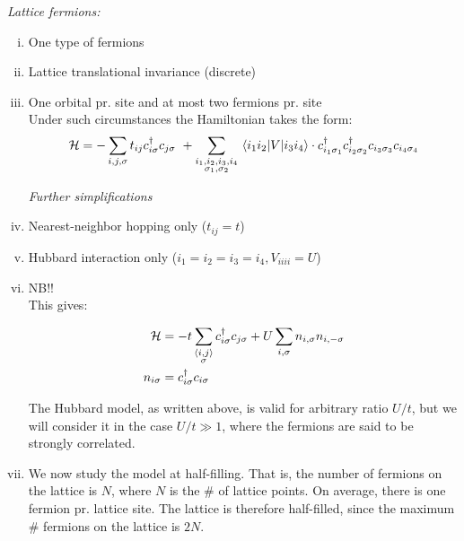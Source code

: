 \emph{Lattice fermions:}
\begin{enumerate}[i)]
	\item One type of fermions
	\item Lattice translational invariance (discrete)
	\item One orbital pr. site and at most two fermions pr. site \\
	
	Under such circumstances the Hamiltonian takes the form:
	\begin{equation}
		\mathcal{H} = - \sum_{i, j, \sigma} t_{ij} c_{i\sigma}^\dagger c_{j\sigma} \ + \sum_{\substack{i_1, i_2, i_3, i_4 \\ \sigma_1, \sigma_2}} \mel{i_1 i_2}{V}{i_3 i_4} \cdot c_{i_1\sigma_1}^\dagger c_{i_2\sigma_2}^\dagger c_{i_3\sigma_3} c_{i_4\sigma_4}
	\end{equation}
	
	\hspace{-0.5cm} \emph{Further simplifications}
	
	\item Nearest-neighbor hopping only ($t_{ij} = t$)
	
	\item Hubbard interaction only ($i_1 = i_2 = i_3 = i_4, V_{iiii} = U$)
	
	\item {} NB!! \\
	
	This gives:
	
	\begin{align}
		\mathcal{H} &= -t \sum_{\substack{\langle i,j \rangle \\ \sigma}} c_{i\sigma}^\dagger c_{j\sigma} + U \sum_{i, \sigma} n_{i, \sigma} n_{i, -\sigma} \\
		n_{i\sigma} &= c_{i\sigma}^\dagger c_{i\sigma}
	\end{align}
	
	The Hubbard model, as written above, is valid for arbitrary ratio $U/t$, but we will consider it in the case $U/t \gg 1 $, where the fermions are said to be strongly correlated.
	
	\item We now study the model at half-filling. That is, the number of fermions on the lattice is $N$, where $N$ is the \# of lattice points. On average, there is one fermion pr. lattice site. The lattice is therefore half-filled, since the maximum \# fermions on the lattice is $2N$. \\
\end{enumerate}


